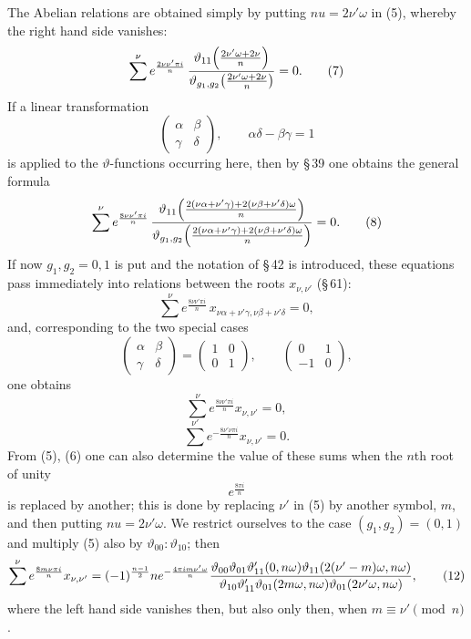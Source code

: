 \documentclass[11pt]{article}
\begin{document}
The Abelian relations are obtained simply by putting $nu=2\nu'\omega$ in (5), whereby
the right hand side vanishes:
\begin{equation}
\sum^\nu e^{\frac{2\nu\nu'\pi i}{n}}\,
{\vartheta_{11}\!\left({2\nu'\omega+2\nu\over n}\right)\over
 \vartheta_{g_1,g_2}\!\left({2\nu'\omega+2\nu\over n}\right)}
=0.
\tag{7}
\end{equation}
If a linear transformation
\[
\begin{pmatrix}\alpha&\beta\\ \gamma&\delta\end{pmatrix},
\qquad \alpha\delta-\beta\gamma=1
\]
is applied to the $\vartheta$-functions occurring here, then by \S\,39 one obtains the
general formula
\begin{equation}
\sum^\nu e^{\frac{8\nu\nu'\pi i}{n}}\,
{\vartheta_{11}\!\left({2(\nu\alpha+\nu'\gamma)+2(\nu\beta+\nu'\delta)\omega\over n}\right)\over
 \vartheta_{g_1,g_2}\!\left({2(\nu\alpha+\nu'\gamma)+2(\nu\beta+\nu'\delta)\omega\over n}\right)}
=0.
\tag{8}
\end{equation}
If now $g_1,g_2=0,1$ is put and the notation of \S\,42 is introduced, these equations pass
immediately into relations between the roots $x_{\nu,\nu'}$ (\S\,61):
\begin{equation}
\sum^\nu e^{\frac{8\nu\nu'\pi i}{n}}\,
x_{\nu\alpha+\nu'\gamma,\nu\beta+\nu'\delta}=0,
\tag{9}
\end{equation}
and, corresponding to the two special cases
\[
\begin{pmatrix}\alpha&\beta\\ \gamma&\delta\end{pmatrix}
=
\begin{pmatrix}1&0\\0&1\end{pmatrix},\qquad
\begin{pmatrix}0&1\\-1&0\end{pmatrix},
\]
one obtains
\begin{equation}
\sum^\nu e^{\frac{8\nu\nu'\pi i}{n}}x_{\nu,\nu'}=0,
\tag{10}
\end{equation}
\begin{equation}
\sum^{\nu'} e^{-\frac{8\nu'\nu\pi i}{n}}x_{\nu,\nu'}=0.
\tag{11}
\end{equation}
From (5), (6) one can also determine the value of these sums when the $n$th root of unity
\[
e^{\frac{8\pi i}{n}}
\]
is replaced by another; this is done by replacing $\nu'$ in (5) by another symbol, $m$,
and then putting $nu=2\nu'\omega$. We restrict ourselves to the case
$(g_1,g_2)=(0,1)$ and multiply (5) also by $\vartheta_{00}:\vartheta_{10}$; then
\begin{equation}
\sum^\nu e^{\frac{8m\nu\pi i}{n}}x_{\nu,\nu'}=
(-1)^{\frac{n-1}{2}} n e^{-\frac{4\pi im\nu'\omega}{n}}
{\vartheta_{00}\vartheta_{01}\vartheta'_{11}(0,n\omega)
 \vartheta_{11}\!\left(2(\nu'-m)\omega,n\omega\right)\over
 \vartheta_{10}\vartheta'_{11}\vartheta_{01}(2m\omega,n\omega)
 \vartheta_{01}(2\nu'\omega,n\omega)},
\tag{12}
\end{equation}
where the left hand side vanishes then, but also only then, when $m\equiv\nu'\pmod n$.
\end{document}
